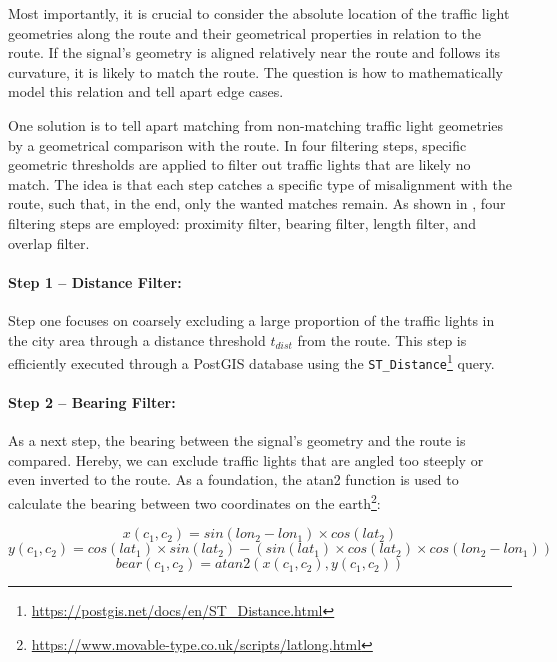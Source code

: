 Most importantly, it is crucial to consider the absolute location of the traffic light geometries along the route and their geometrical properties in relation to the route. If the signal's geometry is aligned relatively near the route and follows its curvature, it is likely to match the route. The question is how to mathematically model this relation and tell apart edge cases.

One solution is to tell apart matching from non-matching traffic light geometries by a geometrical comparison with the route. In four filtering steps, specific geometric thresholds are applied to filter out traffic lights that are likely no match. The idea is that each step catches a specific type of misalignment with the route, such that, in the end, only the wanted matches remain. As shown in , four filtering steps are employed: proximity filter, bearing filter, length filter, and overlap filter.

\paragraph{Step 1 -- Distance Filter:} Step one focuses on coarsely excluding a large proportion of the traffic lights in the city area through a distance threshold $t_{dist}$ from the route. This step is efficiently executed through a PostGIS database using the \texttt{ST\_Distance}\footnote{\url{https://postgis.net/docs/en/ST\_Distance.html}} query.

\paragraph{Step 2 -- Bearing Filter:} As a next step, the bearing between the signal's geometry and the route is compared. Hereby, we can exclude traffic lights that are angled too steeply or even inverted to the route. As a foundation, the atan2 function is used to calculate the bearing between two coordinates on the earth\footnote{\url{https://www.movable-type.co.uk/scripts/latlong.html}}:

\begin{equation}
x(c_1, c_2) = sin(lon_2 - lon_1) \times cos(lat_2)
\end{equation}
\begin{equation}
y(c_1, c_2) = cos(lat_1) \times sin(lat_2) - (sin(lat_1) \times cos(lat_2) \times cos(lon_2 - lon_1))
\end{equation}
\begin{equation}
bear(c_1, c_2) = atan2(x(c_1, c_2), y(c_1, c_2))
\end{equation}

